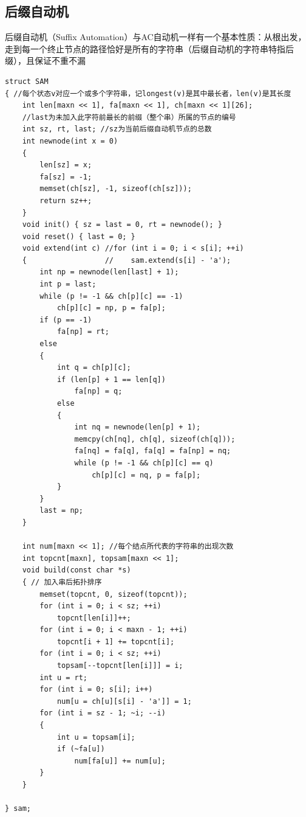 \documentclass[twoside]{article}
\begin{document}
\subsection{后缀自动机}
后缀自动机（Suffix Automation）与AC自动机一样有一个基本性质：从根出发，走到每一个终止节点的路径恰好是所有的字符串（后缀自动机的字符串特指后缀），且保证不重不漏
\begin{lstlisting}
struct SAM
{ //每个状态v对应一个或多个字符串，记longest(v)是其中最长者，len(v)是其长度
    int len[maxn << 1], fa[maxn << 1], ch[maxn << 1][26];
    //last为未加入此字符前最长的前缀（整个串）所属的节点的编号
    int sz, rt, last; //sz为当前后缀自动机节点的总数
    int newnode(int x = 0)
    {
        len[sz] = x;
        fa[sz] = -1;
        memset(ch[sz], -1, sizeof(ch[sz]));
        return sz++;
    }
    void init() { sz = last = 0, rt = newnode(); }
    void reset() { last = 0; }
    void extend(int c) //for (int i = 0; i < s[i]; ++i)
    {                  //    sam.extend(s[i] - 'a');
        int np = newnode(len[last] + 1);
        int p = last;
        while (p != -1 && ch[p][c] == -1)
            ch[p][c] = np, p = fa[p];
        if (p == -1)
            fa[np] = rt;
        else
        {
            int q = ch[p][c];
            if (len[p] + 1 == len[q])
                fa[np] = q;
            else
            {
                int nq = newnode(len[p] + 1);
                memcpy(ch[nq], ch[q], sizeof(ch[q]));
                fa[nq] = fa[q], fa[q] = fa[np] = nq;
                while (p != -1 && ch[p][c] == q)
                    ch[p][c] = nq, p = fa[p];
            }
        }
        last = np;
    }

    int num[maxn << 1]; //每个结点所代表的字符串的出现次数
    int topcnt[maxn], topsam[maxn << 1];
    void build(const char *s)
    { // 加入串后拓扑排序
        memset(topcnt, 0, sizeof(topcnt));
        for (int i = 0; i < sz; ++i)
            topcnt[len[i]]++;
        for (int i = 0; i < maxn - 1; ++i)
            topcnt[i + 1] += topcnt[i];
        for (int i = 0; i < sz; ++i)
            topsam[--topcnt[len[i]]] = i;
        int u = rt;
        for (int i = 0; s[i]; i++)
            num[u = ch[u][s[i] - 'a']] = 1;
        for (int i = sz - 1; ~i; --i)
        {
            int u = topsam[i];
            if (~fa[u])
                num[fa[u]] += num[u];
        }
    }

} sam;
\end{lstlisting}
\end{document}
